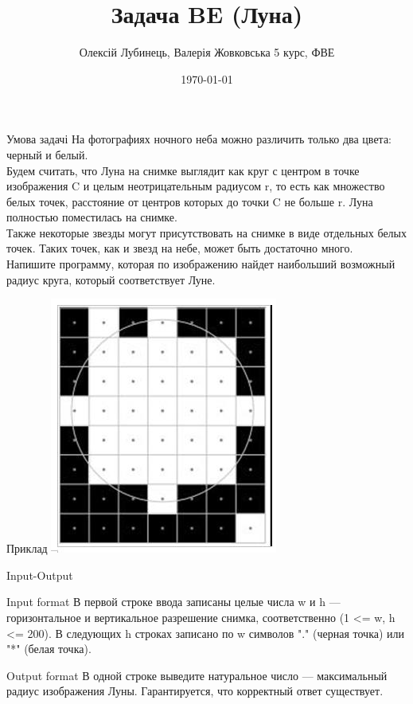 \documentclass{beamer}
\begin{document}
\title{Задача BE (Луна)}
\author{Олексій Лубинець, Валерія Жовковська 5 курс, ФВЕ}
\date{\today} 

\thispagestyle{empty}%
\frame{\titlepage}

\begin{frame}{Умова задачі}
На фотографиях ночного неба можно различить только два цвета: черный и белый.
\\
Будем считать, что Луна на снимке выглядит как круг с центром в точке изображения C и целым неотрицательным радиусом r, то есть как множество белых точек, расстояние от центров которых до точки C не больше r. Луна полностью поместилась на снимке.
\\
Также некоторые звезды могут присутствовать на снимке в виде отдельных белых точек. Таких точек, как и звезд на небе, может быть достаточно много.
\\
Напишите программу, которая по изображению найдет наибольший возможный радиус круга, который соответствует Луне.
\end{frame}

\begin{frame}{Приклад}
\includegraphics[scale=0.5]{moon.jpg}
\end{frame}

\begin{frame}{Input-Output}
\begin{block}{Input format}
В первой строке ввода записаны целые числа w и h — горизонтальное и вертикальное разрешение снимка, соответственно (1 <= w, h <= 200). В следующих h строках записано по w символов "." (черная точка) или "*" (белая точка).
\end{block}
\begin{block}{Output format}
В одной строке выведите натуральное число — максимальный радиус изображения Луны. Гарантируется, что корректный ответ существует.
\end{block}
\end{frame}
\end{document}
